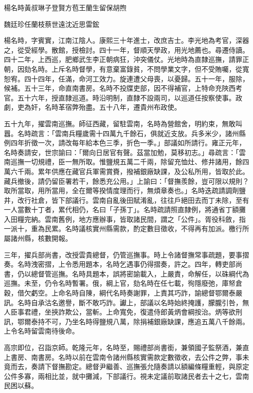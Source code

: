 
\begin{pinyinscope}
楊名時黃叔琳子登賢方苞王蘭生留保胡煦

魏廷珍任蘭枝蔡世遠沈近思雷鋐

楊名時，字賓實，江南江陰人。康熙三十年進士，改庶吉士。李光地為考官，深器之，從受經學。散館，授檢討。四十一年，督順天學政，用光地薦也。尋遷侍讀。四十二年，上西巡，肥鄉武生李正朝病狂，沖突儀仗。光地時為直隸巡撫，請罪正朝，因劾名時。上斥名時督學，有意棄富錄貧，不問學業文字，但不受賄囑，從寬恕宥。四十四年，任滿，命河工效力。旋連遭父母喪，以憂歸。五十一年，服除，候補。五十三年，命直南書房。名時不投牒吏部，因不得補官，上特命充陜西考官。五十六年，授直隸巡道。時沿明制，直隸不設兩司，以巡道任按察使事。政劇，吏為奸，名時革宿弊殆盡。五十八年，遷貴州布政使。

五十九年，擢雲南巡撫。師征西藏，留駐雲南，名時為營館舍，明約束，無敢叫囂。名時疏言：「雲南兵糧歲需十四萬九千餘石，俱就近支放。兵多米少，諸州縣例四年折徵一次，請改每年給本色三季，折色一季。」部議如所請行。雍正元年，名時奏請安，世宗諭曰：「爾向日居官有聲。茲當加勉，莫移初志。」尋疏言：「雲南巡撫一切規禮，臣一無所取。惟鹽規五萬二千兩，除留充恤灶、修井諸用，餘四萬六千兩。累年供應在藏官兵軍需賞賚，撥補銀廠缺課，及公私所用，皆取於此。藏兵撤後，請仍留臣署若干，餘悉充公用。」上諭曰：「督撫羨餘，豈可限以規則？取所當取，用所當用，全在爾等揆情度理而行，無煩章奏也。」名時迭疏請調劑鹽井，改行社倉，皆下部議行。雲南自亂後田賦淆亂，往往戶絕田去而丁未除，至有一人當數十丁者，累代相仍，名曰「子孫丁」。名時疏請照直隸例，將通省丁額攤入田糧完納。雲南舊例，地方應辦事，皆取諸民間，謂之「公件」。胥役科斂，指一派十，重為民累。名時議核實州縣需款，酌定數目徵收，不得再有加派。檄行所屬諸州縣，核數開報。

三年，擢兵部尚書，改授雲貴總督，仍管巡撫事。時上令諸督撫常事疏題，要事摺奏。名時洩密摺，上令悉用題本，名時乞遇事仍得摺奏，許之。四年，轉吏部尚書，仍以總督管巡撫。名時具題本，誤將密諭載入，上嚴責，命解任，以硃綱代為巡撫。未至，仍令名時暫署。俄，綱上官，劾名時在任七載，徇隱廢弛，庫帑倉穀，借欠虧空。上命名時自陳，綱代名時奏謝罪，上責其巧詐，諭總督鄂爾泰嚴訊。名時自承沽名邀譽，斷不敢巧詐。讞上，部議以名時始終掩護，朦朧引咎，無人臣事君禮，坐挾詐欺公，當斬。上命寬免，復遣侍郎黃炳會綱按治。炳等欲刑訊，鄂爾泰持不可，乃坐名時得鹽規八萬，除捐補銀廠缺課，應追五萬八千餘兩。上令名時留雲南待後命。

高宗即位，召詣京師。乾隆元年，名時至，賜禮部尚書銜，兼領國子監祭酒，兼直上書房、南書房。名時以前在雲南令諸州縣核實需款定數徵收，去公件之弊，事未竟而去，奏請下督撫勘定。總督尹繼善、巡撫張允隨奏請以額編條糧重輕，與原定公件多寡，兩相比並，就中攤減，下部議行。視未定議前取諸民者去十之七，雲南民困以蘇。


\end{pinyinscope}
